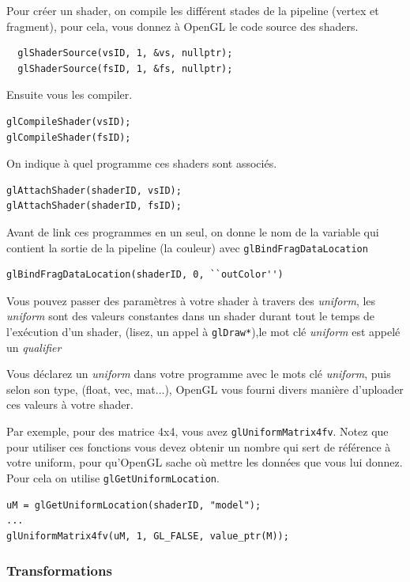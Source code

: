 \documentclass[pdftex, 11pt, a4paper, titlepage]{article}
\begin{document}
Pour créer un shader, on compile les différent stades de la pipeline
(vertex et fragment), pour cela, vous donnez à OpenGL le code source
des shaders.
\begin{lstlisting}
  glShaderSource(vsID, 1, &vs, nullptr);
  glShaderSource(fsID, 1, &fs, nullptr);
\end{lstlisting}

Ensuite vous les compiler.

\begin{lstlisting}
glCompileShader(vsID);
glCompileShader(fsID);
\end{lstlisting}

On indique à quel programme ces shaders sont associés.

\begin{lstlisting}
glAttachShader(shaderID, vsID);
glAttachShader(shaderID, fsID);
\end{lstlisting}

Avant de link ces programmes en un seul, on donne le nom de la
variable qui contient la sortie de la pipeline (la couleur) avec
\texttt{glBindFragDataLocation}

\begin{lstlisting}
glBindFragDataLocation(shaderID, 0, ``outColor'')
\end{lstlisting}

Vous pouvez passer des paramètres à votre shader à travers des
\emph{uniform}, les \emph{uniform} sont des valeurs constantes 
dans un shader durant tout le temps de l'exécution d'un shader,
 (lisez, un appel à \texttt{glDraw*}),le mot clé \emph{uniform} 
est appelé un \textit{qualifier}

Vous déclarez un \emph{uniform} dans votre programme avec le mots clé
\emph{uniform}, puis selon son type, (float, vec, mat...), OpenGL vous fourni
divers manière d'uploader ces valeurs à votre shader.

Par exemple, pour des matrice 4x4, vous avez
\texttt{glUniformMatrix4fv}.  Notez que pour utiliser ces fonctions
vous devez obtenir un nombre qui sert de référence à votre uniform,
pour qu'OpenGL sache où mettre les données que vous lui donnez. Pour
cela on utilise \texttt{glGetUniformLocation}.

\begin{lstlisting}
uM = glGetUniformLocation(shaderID, "model");
...
glUniformMatrix4fv(uM, 1, GL_FALSE, value_ptr(M));
\end{lstlisting}
\pagebreak
\subsubsection{Transformations}
\end{document}
